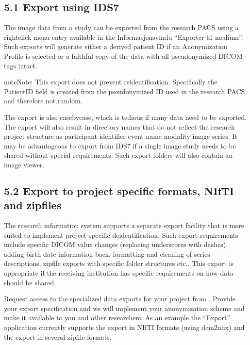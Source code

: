 \documentclass[letterpaper,10pt,english]{sphinxmanual}
\begin{document}
\subsection{5.1 Export using IDS7}
\label{\detokenize{EndUser/index:export-using-ids7}}
\sphinxAtStartPar
The image data from a study can be exported from the research PACS using a right\sphinxhyphen{}click menu entry available in the Informasjonsvindu “Exporter til medium”. Such exports will generate either a derived patient ID \textendash{} if an Anonymization Profile is selected or a faithful copy of the data with all pseudonymized DICOM tags intact.

\begin{sphinxadmonition}{note}{Note:}
\sphinxAtStartPar
This export does not prevent re\sphinxhyphen{}identification. Specifically the PatientID field is created from the pseudonymized ID used in the research PACS and therefore not random.
\end{sphinxadmonition}

\sphinxAtStartPar
The export is also case\sphinxhyphen{}by\sphinxhyphen{}case, which is tedious if many data need to be exported. The export will also result in directory names that do not reflect the research project structure as participant identifier \textendash{} event name \textendash{} modality \textendash{} image series. It may be advantageous to export from IDS7 if a single image study needs to be shared without special requirements. Such export folders will also contain an image viewer.


\subsection{5.2 Export to project specific formats, NIfTI and zip\sphinxhyphen{}files}
\label{\detokenize{EndUser/index:export-to-project-specific-formats-nifti-and-zip-files}}
\sphinxAtStartPar
The research information system supports a separate export facility that is more suited to implement project specific de\sphinxhyphen{}identification. Such export requirements include specific DICOM value changes (replacing underscores with dashes), adding birth date information back, formatting and cleaning of series descriptions, zip\sphinxhyphen{}file exports with specific folder structures etc.. This export is appropriate if the receiving institution has specific requirements on how data should be shared.

\sphinxAtStartPar
Request access to the specialized data exports for your project from . Provide your export specification and we will implement your anonymization scheme and make it available to you and other researchers. As an example the “Export” application currently supports the export in NIfTI formats (using dcm2niix) and the export in several zip\sphinxhyphen{}file formats.
\end{document}
